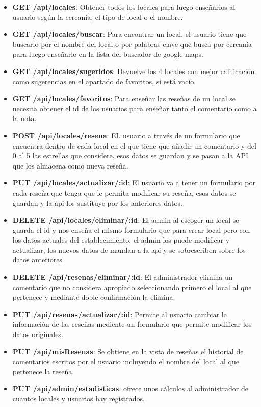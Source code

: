 \documentclass[a4paper,11pt]{article}
\begin{document}
\begin{itemize}
    \item \textbf{GET /api/locales}: Obtener todos los locales para luego enseñarlos al usuario según la cercanía, el tipo de local o el nombre. 
    \item \textbf{GET /api/locales/buscar}: Para encontrar un local, el usuario tiene que buscarlo por el nombre del local o por palabras clave que busca por cercanía para luego enseñarlo en la lista del buscador de google maps. 
    \item \textbf{GET /api/locales/sugeridos}: Devuelve los 4 locales con mejor calificación como sugerencias en el apartado de favoritos, si está vacío.
    \item \textbf{GET /api/locales/favoritos}: Para enseñar las reseñas de un local se necesita obtener el id de los usuarios para enseñar tanto el comentario como a la nota.
    \item \textbf{POST /api/locales/resena}: EL usuario a través de un formulario que encuentra dentro de cada local en el que tiene que añadir un comentario y del 0 al 5 las estrellas que considere, esos datos se guardan y se pasan a la API que los almacena como nueva reseña.
    \item \textbf{PUT /api/locales/actualizar/:id}: El usuario va a tener un formulario por cada reseña que tenga que le permita modificar su reseña, esos datos se guardan y la api los sustituye por los anteriores datos.
    \item \textbf{DELETE /api/locales/eliminar/:id}: El admin al escoger un local se guarda el id y nos enseña el mismo formulario que para crear local pero con los datos actuales del establecimiento, el admin los puede modificar y actualizar, los nuevos datos de mandan a la api y se sobrescriben sobre los datos anteriores.
    \item \textbf{DELETE /api/resenas/eliminar/:id}: El administrador elimina un comentario que no considera apropiado seleccionando primero el local al que pertenece y mediante doble confirmación la elimina.
    \item \textbf{PUT /api/resenas/actualizar/:id}: Permite al usuario cambiar la información de las reseñas mediente un formulario que permite modificar los datos originales.
    \item \textbf{PUT /api/misResenas}: Se obtiene en la vista de reseñas el historial de comentarios escritos por el usuario incluyendo el nombre del local al que pertenece la reseña.
    \item \textbf{PUT /api/admin/estadisticas}: ofrece unos cálculos al administrador de cuantos locales y usuarios hay registrados.
\end{itemize}
\end{document}
